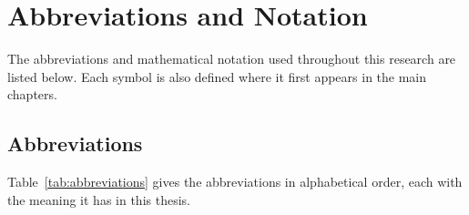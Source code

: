 \clearpage
{}
\chapter*{Abbreviations and Notation}
\label{ch:abbreviations}
\let\FrontMatterSavedThetable\thetable
\renewcommand{\thetable}{\Roman{table}}

The abbreviations and mathematical notation used throughout this research are listed below. Each symbol is also defined where it first appears in the main chapters.

\section*{Abbreviations}
\label{sec:abbrev-table}

Table~\ref{tab:abbreviations} gives the abbreviations in alphabetical order, each with the meaning it has in this thesis.


